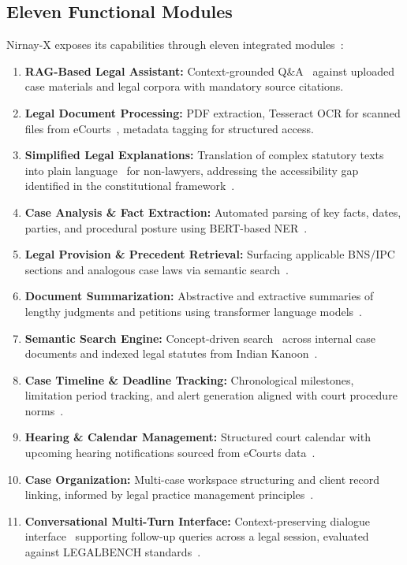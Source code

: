 \documentclass[12pt,a4paper]{article}
\begin{document}
\subsection{Eleven Functional Modules}

Nirnay-X exposes its capabilities through eleven integrated modules~\cite{ashley2017ai}:

\begin{enumerate}[leftmargin=*, label=\arabic*., itemsep=3pt]
  \item \textbf{RAG-Based Legal Assistant:} Context-grounded Q\&A~\cite{lewis2020rag}
    against uploaded case materials and legal corpora with mandatory source citations.
  \item \textbf{Legal Document Processing:} PDF extraction, Tesseract OCR for scanned
    files from eCourts~\cite{ecourts}, metadata tagging for structured access.
  \item \textbf{Simplified Legal Explanations:} Translation of complex statutory texts
    into plain language~\cite{vaswani2017attention} for non-lawyers, addressing the
    accessibility gap identified in the constitutional framework~\cite{const_india}.
  \item \textbf{Case Analysis \& Fact Extraction:} Automated parsing of key facts,
    dates, parties, and procedural posture using BERT-based NER~\cite{devlin2019bert}.
  \item \textbf{Legal Provision \& Precedent Retrieval:} Surfacing applicable BNS/IPC
    sections and analogous case laws via semantic search~\cite{reimers2019sbert,
    feng2022survey, cui2022survey}.
  \item \textbf{Document Summarization:} Abstractive and extractive summaries of
    lengthy judgments and petitions using transformer language
    models~\cite{vaswani2017attention, devlin2019bert}.
  \item \textbf{Semantic Search Engine:} Concept-driven search~\cite{reimers2019sbert,
    manning2008ir} across internal case documents and indexed legal statutes from
    Indian Kanoon~\cite{indiankanoon}.
  \item \textbf{Case Timeline \& Deadline Tracking:} Chronological milestones,
    limitation period tracking, and alert generation aligned with court procedure
    norms~\cite{ecourts, mlaw}.
  \item \textbf{Hearing \& Calendar Management:} Structured court calendar with
    upcoming hearing notifications sourced from eCourts data~\cite{ecourts}.
  \item \textbf{Case Organization:} Multi-case workspace structuring and client record
    linking, informed by legal practice management principles~\cite{ashley2017ai}.
  \item \textbf{Conversational Multi-Turn Interface:} Context-preserving dialogue
    interface~\cite{vaswani2017attention} supporting follow-up queries across a legal
    session, evaluated against LEGALBENCH standards~\cite{guha2023legalbench}.
\end{enumerate}
\end{document}
